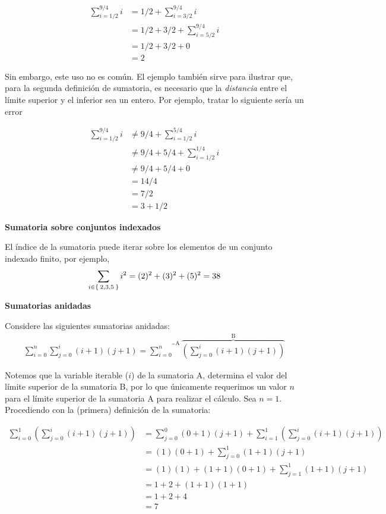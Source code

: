 \begin{align*}
  \sum_{i=1/2}^{9/4} i &= 1/2 + \sum_{i=3/2}^{9/4} i \\
  &= 1/2 + 3/2 + \sum_{i=5/2}^{9/4} i\\
  &= 1/2 + 3/2 + 0\\
  &= 2
\end{align*}

Sin embargo, este uso no es común. El ejemplo también sirve para ilustrar que, para la segunda definición de sumatoria, es necesario que la \textit{distancia} entre el límite superior y el inferior sea un entero. Por ejemplo, tratar lo siguiente sería un error

\begin{align*}
  \sum_{i=1/2}^{9/4} i &\neq 9/4 + \sum_{i=1/2}^{5/4} i\\
  &\neq 9/4 + 5/4 + \sum_{i=1/2}^{1/4} i\\
  &\neq 9/4 + 5/4 + 0\\
  &= 14/4\\
  &= 7/2\\
  &= 3 + 1/2
\end{align*}

\textbf{Sumatoria sobre conjuntos indexados}

El índice de la sumatoria puede iterar sobre los elementos de un conjunto indexado finito, por ejemplo, \[\sum_{i\in \Set{2, 3, 5}} i^2 = (2)^2 + (3)^2 + (5)^2 = 38\]

\textbf{Sumatorias anidadas}

Considere las siguientes sumatorias anidadas:
\begin{align*}
  \sum_{i=0}^{n} \sum_{j=0}^{i} (i+1)(j+1) = \overbrace{\sum_{i=0}^{n}}^{\text{A}} \overbrace{\left(\sum_{j=0}^{i} (i+1)(j+1)\right)}^{\text{B}}
\end{align*}

Notemos que la variable iterable ($i$) de la sumatoria A, determina el valor del límite superior de la sumatoria B, por lo que únicamente requerimos un valor $n$ para el límite superior de la sumatoria A para realizar el cálculo. Sea $n=1$. Procediendo con la (primera) definición de la sumatoria:

\begin{align*}
  \sum_{i=0}^{1} \left(\sum_{j=0}^{i}(i+1)(j+1)\right) &= \sum_{j=0}^{0} (0+1)(j+1) + \sum_{i=1}^{1} \left(\sum_{j=0}^{i}(i+1)(j+1)\right) \\
  &= (1)(0+1) + \sum_{j=0}^{1} (1+1) (j+1)\\
  &= (1)(1) + (1+1)(0+1) + \sum_{j=1}^{1} (1+1) (j+1)\\
  &= 1 + 2 + (1+1)(1+1)\\
  &= 1 + 2 + 4\\
  &= 7
\end{align*}

